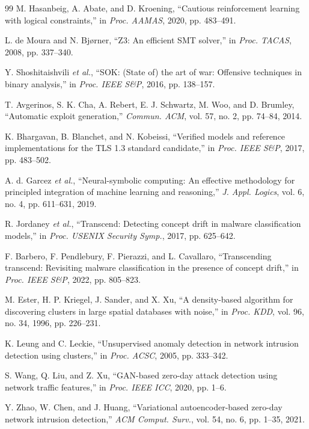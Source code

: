 \documentclass[conference]{IEEEtran}
\begin{document}
\begin{thebibliography}{99}
M. Hasanbeig, A. Abate, and D. Kroening, ``Cautious reinforcement learning with logical constraints,'' in \emph{Proc. AAMAS}, 2020, pp. 483--491.

L. de Moura and N. Bj{\o}rner, ``Z3: An efficient SMT solver,'' in \emph{Proc. TACAS}, 2008, pp. 337--340.

Y. Shoshitaishvili \emph{et al.}, ``SOK: (State of) the art of war: Offensive techniques in binary analysis,'' in \emph{Proc. IEEE S\&P}, 2016, pp. 138--157.

T. Avgerinos, S. K. Cha, A. Rebert, E. J. Schwartz, M. Woo, and D. Brumley, ``Automatic exploit generation,'' \emph{Commun. ACM}, vol. 57, no. 2, pp. 74--84, 2014.

K. Bhargavan, B. Blanchet, and N. Kobeissi, ``Verified models and reference implementations for the TLS 1.3 standard candidate,'' in \emph{Proc. IEEE S\&P}, 2017, pp. 483--502.

A. d. Garcez \emph{et al.}, ``Neural-symbolic computing: An effective methodology for principled integration of machine learning and reasoning,'' \emph{J. Appl. Logics}, vol. 6, no. 4, pp. 611--631, 2019.

R. Jordaney \emph{et al.}, ``Transcend: Detecting concept drift in malware classification models,'' in \emph{Proc. USENIX Security Symp.}, 2017, pp. 625--642.

F. Barbero, F. Pendlebury, F. Pierazzi, and L. Cavallaro, ``Transcending transcend: Revisiting malware classification in the presence of concept drift,'' in \emph{Proc. IEEE S\&P}, 2022, pp. 805--823.

M. Ester, H. P. Kriegel, J. Sander, and X. Xu, ``A density-based algorithm for discovering clusters in large spatial databases with noise,'' in \emph{Proc. KDD}, vol. 96, no. 34, 1996, pp. 226--231.

K. Leung and C. Leckie, ``Unsupervised anomaly detection in network intrusion detection using clusters,'' in \emph{Proc. ACSC}, 2005, pp. 333--342.

S. Wang, Q. Liu, and Z. Xu, ``GAN-based zero-day attack detection using network traffic features,'' in \emph{Proc. IEEE ICC}, 2020, pp. 1--6.

Y. Zhao, W. Chen, and J. Huang, ``Variational autoencoder-based zero-day network intrusion detection,'' \emph{ACM Comput. Surv.}, vol. 54, no. 6, pp. 1--35, 2021.


\end{thebibliography}
\end{document}
